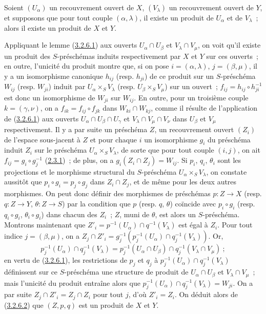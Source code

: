 \begin{lemma}[3.2.6.3]
\label{I.3.2.6.3-fr}
Soient $(U_\alpha)$ un recouvrement ouvert de $X$, $(V_\lambda)$ un
recouvrement ouvert de $Y$, et supposons que pour tout couple
$(\alpha,\lambda)$, il existe un produit de $U_\alpha$ et de $V_\lambda$~;
alors il existe un produit de $X$ et $Y$.
\end{lemma}

Appliquant le lemme (\hyperref[I.3.2.6.1-fr]{3.2.6.1}) aux ouverts
$U_\alpha\cap U_\beta$ et $V_\lambda\cap V_\mu$, on voit qu'il existe un
produit des $S$-préschémas induits respectivement par $X$ et $Y$ sur ces
ouverts~; en outre, l'unicité du produit montre que, si on pose
$i=(\alpha,\lambda)$, $j=(\beta,\mu)$, il y a un isomorphisme canonique
$h_{ij}$ (resp. $h_{ji}$) de ce produit sur un $S$-préschéma $W_{ij}$
(resp. $W_{ji}$) induit par $U_\alpha\times_S V_\lambda$
(resp. $U_\beta\times_S V_\mu$) sur un ouvert~;
$f_{ij}=h_{ij}\circ h_{ji}^{-1}$ est donc un isomorphisme de $W_{ji}$ sur
$W_{ij}$. En outre, pour un troisième couple $k=(\gamma,\nu)$, on a
$f_{ik}=f_{ij}\circ f_{jk}$ dans $W_{ki}\cap W_{kj}$, comme il résulte de
l'application de (\hyperref[I.3.2.6.1-fr]{3.2.6.1}) aux ouverts
$U_\alpha\cap U_\beta\cap U_\gamma$ et
$V_\lambda\cap V_\mu\cap V_\nu$ dans $U_\beta$ et $V_\mu$
respectivement. Il y a par suite un préschéma $Z$, un recouvrement ouvert
$(Z_i)$ de l'espace sous-jacent à $Z$ et pour chaque $i$ un isomorphisme $g_i$
du préschéma induit $Z_i$ sur le préschéma
$U_\alpha\times_S V_\lambda$, de sorte que pour tout couple $(i,j)$, on ait
$f_{ij}=g_i\circ g_j^{-1}$
(\hyperref[I.2.3.1-fr]{2.3.1})~; de plus, on a
$g_i(Z_i\cap Z_j)=W_{ij}$. Si $p_i$, $q_i$, $\theta_i$ sont les projections
et le morphisme structural du $S$-préschéma
$U_\alpha\times_S V_\lambda$, on constate aussitôt que
$p_i\circ g_i=p_j\circ g_j$ dans $Z_i\cap Z_j$, et de même pour les deux
autres morphismes. On peut donc définir des morphismes de préschémas
$p:Z\to X$ (resp. $q:Z\to Y$, $\theta:Z\to S$) par la condition que $p$
(resp. $q$, $\theta$) coïncide avec $p_i\circ g_i$
(resp. $q_i\circ g_i$, $\theta_i\circ g_i$) dans chacun des $Z_i$~; $Z$,
muni de $\theta$, est alors un $S$-préschéma. Montrons maintenant que
$Z'_i=p^{-1}(U_\alpha)\cap q^{-1}(V_\lambda)$ est égal à $Z_i$. Pour tout
indice $j=(\beta,\mu)$, on a
$Z_j\cap Z'_i=g_j^{-1}(p_j^{-1}(U_\alpha)\cap q_j^{-1}(V_\lambda))$. Or,
\[
  p_j^{-1}(U_\alpha)\cap q_j^{-1}(V_\lambda)
  =p_j^{-1}(U_\alpha\cap U_\beta)\cap
   q_j^{-1}(V_\lambda\cap V_\mu)~;
\]
en vertu de (\hyperref[I.3.2.6.1-fr]{3.2.6.1}), les restrictions de $p_j$ et
$q_j$ à
$p_j^{-1}(U_\alpha)\cap q_j^{-1}(V_\lambda)$ définissent sur ce
$S$-préschéma une structure de produit de $U_\alpha\cap U_\beta$ et
$V_\lambda\cap V_\mu$~; mais l'unicité du produit entraîne alors que
$p_j^{-1}(U_\alpha)\cap q_j^{-1}(V_\lambda)=W_{ji}$. On a par suite
$Z_j\cap Z'_i=Z_j\cap Z_i$ pour tout $j$, d'où $Z'_i=Z_i$. On déduit alors
de (\hyperref[I.3.2.6.2-fr]{3.2.6.2}) que $(Z,p,q)$ est un produit de $X$ et
$Y$.

